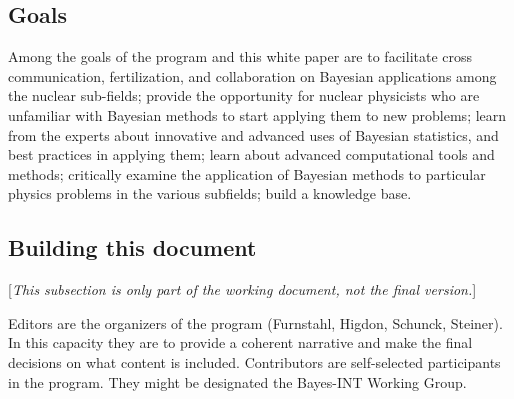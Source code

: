 \subsection{Goals} \label{subsec:goals}

Among the goals of the program and this white paper are to 
\bi
  \I facilitate cross communication, fertilization, and collaboration on Bayesian applications among the nuclear sub-fields; 
  \I provide the opportunity for nuclear physicists who are unfamiliar with Bayesian methods to start applying them to new problems; 
  \I learn from the experts about innovative and advanced uses of Bayesian statistics, and best practices in applying them; 
  \I learn about advanced computational tools and methods; 
  \I critically examine the application of Bayesian methods to particular physics problems in the various subfields;
  \I build a knowledge base.
\ei  



\subsection{Building this document} \label{subsec:document}

[\emph{This subsection is only part of the working document, not the final version.}]

\bi
  \I Editors are the organizers of the program (Furnstahl, Higdon, Schunck, Steiner).
     In this capacity they are to provide a coherent narrative and make the final decisions 
     on what content is included.
  \I Contributors are self-selected participants in the program.  They might be designated
      the Bayes-INT Working Group.
\ei


